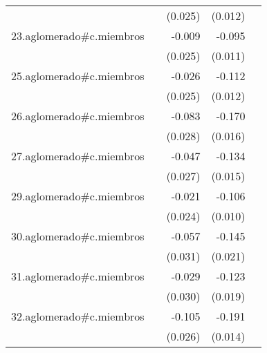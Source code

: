 {\begin{longtable}{l*{4}{D{.}{.}{-1}}}
            &                     &     (0.025)         &     (0.012)         &                     \\
\addlinespace
23.aglomerado#c.miembros&                     &      -0.009         &      -0.095\sym{***}&                     \\
            &                     &     (0.025)         &     (0.011)         &                     \\
\addlinespace
25.aglomerado#c.miembros&                     &      -0.026         &      -0.112\sym{***}&                     \\
            &                     &     (0.025)         &     (0.012)         &                     \\
\addlinespace
26.aglomerado#c.miembros&                     &      -0.083\sym{**} &      -0.170\sym{***}&                     \\
            &                     &     (0.028)         &     (0.016)         &                     \\
\addlinespace
27.aglomerado#c.miembros&                     &      -0.047         &      -0.134\sym{***}&                     \\
            &                     &     (0.027)         &     (0.015)         &                     \\
\addlinespace
29.aglomerado#c.miembros&                     &      -0.021         &      -0.106\sym{***}&                     \\
            &                     &     (0.024)         &     (0.010)         &                     \\
\addlinespace
30.aglomerado#c.miembros&                     &      -0.057         &      -0.145\sym{***}&                     \\
            &                     &     (0.031)         &     (0.021)         &                     \\
\addlinespace
31.aglomerado#c.miembros&                     &      -0.029         &      -0.123\sym{***}&                     \\
            &                     &     (0.030)         &     (0.019)         &                     \\
\addlinespace
32.aglomerado#c.miembros&                     &      -0.105\sym{***}&      -0.191\sym{***}&                     \\
            &                     &     (0.026)         &     (0.014)         &                     \\

\end{longtable}}
